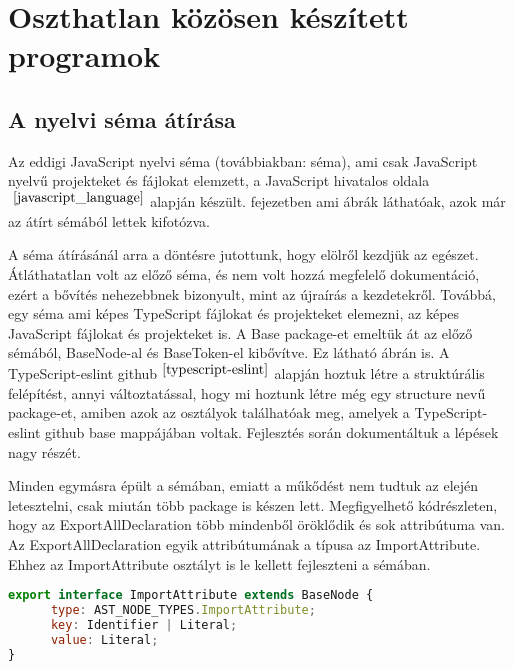\chapter{Oszthatlan közösen készített programok}\label{chap:oszthatlan_kozos_dolgok}

\section{A nyelvi séma átírása}

\noindent

Az eddigi JavaScript nyelvi séma (továbbiakban: séma), ami csak JavaScript nyelvű projekteket és fájlokat elemzett, a JavaScript hivatalos oldala$^{~\cite{javascript_language}}$ alapján készült.
 fejezetben ami ábrák láthatóak, azok már az átírt sémából lettek kifotózva.

\noindent

A séma átírásánál arra a döntésre jutottunk, hogy elölről kezdjük az egészet.
Átláthatatlan volt az előző séma, és nem volt hozzá megfelelő dokumentáció, ezért a bővítés nehezebbnek bizonyult, mint az újraírás a kezdetekről.
Továbbá, egy séma ami képes TypeScript fájlokat és projekteket elemezni, az képes JavaScript fájlokat és projekteket is.
A Base package-et emeltük át az előző sémából, BaseNode-al és BaseToken-el kibővítve. Ez látható  ábrán is.
A TypeScript-eslint github$^{~\cite{typescript-eslint}}$ alapján hoztuk létre a struktúrális felépítést,
annyi változtatással, hogy mi hoztunk létre még egy structure nevű package-et, amiben azok az osztályok találhatóak meg, amelyek a TypeScript-eslint github base mappájában voltak.
Fejlesztés során dokumentáltuk a lépések nagy részét.

\noindent

Minden egymásra épült a sémában, emiatt a műkődést nem tudtuk az elején letesztelni, csak miután több package is készen lett.
Megfigyelhető  kódrészleten, hogy az ExportAllDeclaration több mindenből öröklődik és sok attribútuma van.
Az ExportAllDeclaration egyik attribútumának a típusa az ImportAttribute.
Ehhez az ImportAttribute osztályt is le kellett fejleszteni a sémában.

\begin{lstlisting}[caption={ImportAttribute},label={lst:asg_file_import_attribute}, language={JavaScript}]
export interface ImportAttribute extends BaseNode {
      type: AST_NODE_TYPES.ImportAttribute;
      key: Identifier | Literal;
      value: Literal;
}
\end{lstlisting}

